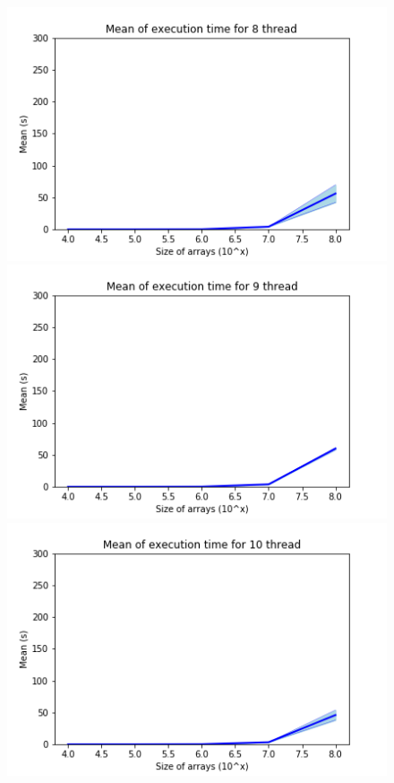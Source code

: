 \documentclass[a4paper,12pt]{article}
\begin{document}
\begin{figure}[ht]
        \includegraphics[width = 0.45\linewidth]{Mean of execution time for 8 thread.png}
        \includegraphics[width = 0.5\linewidth]{Mean of execution time for 9 thread.png}
        \includegraphics[width = 0.5\linewidth]{Mean of execution time for 10 thread.png}
    \end{figure}

    
\newpage
\end{document}
